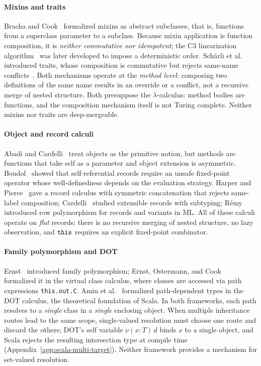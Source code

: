 \paragraph{Mixins and traits}
Bracha and Cook~\cite{bracha1990-mixin-inheritance} formalized mixins as
abstract subclasses, that is, functions from a superclass parameter to a
subclass.
Because mixin application is function composition, it is
\emph{neither commutative nor idempotent}; the C3 linearization
algorithm~\cite{barrett1996-c3-linearization} was later developed to impose a
deterministic order.
Sch\"arli et al.~\cite{scharli2003-traits} introduced traits,
whose composition is commutative but rejects same-name
conflicts~\cite{ducasse2006-traits-fine-grained-reuse}.
Both mechanisms operate at the \emph{method level}: composing two
definitions of the same name results in an override or a conflict,
not a recursive merge of nested structure.
Both presuppose the $\lambda$-calculus: method bodies are functions,
and the composition mechanism itself is not Turing complete.
Neither mixins nor traits are deep-mergeable.

\paragraph{Object and record calculi}
Abadi and Cardelli~\cite{abadi1996-theory-of-objects} treat objects as the
primitive notion, but methods are functions that take self as a
parameter and object extension is asymmetric.
Boudol~\cite{boudol2004-recursive-record-semantics} showed that self-referential
records require an unsafe fixed-point operator whose
well-definedness depends on the evaluation strategy.
Harper and Pierce~\cite{harper1991-symmetric-record-concatenation} gave a record
calculus with symmetric concatenation that rejects same-label
composition;
Cardelli~\cite{cardelli1992-extensible-records} studied extensible records
with subtyping;
R\'emy~\cite{remy1989-row-polymorphism} introduced row polymorphism for
records and variants in ML.
All of these calculi operate on \emph{flat} records: there is
no recursive merging of nested structure, no lazy observation,
and $\mathtt{this}$ requires an explicit fixed-point combinator.

\paragraph{Family polymorphism and DOT}
Ernst~\cite{ernst2001-family-polymorphism} introduced family polymorphism;
Ernst, Ostermann, and Cook~\cite{ernst2006-virtual-class-calculus}
formalized it in the virtual class calculus, where classes are
accessed via path expressions \texttt{this.out.C}.
Amin et al.~\cite{amin2016-dependent-object-types} formalized path-dependent types
in the DOT calculus, the theoretical foundation of Scala.
In both frameworks, each path resolves to a
\emph{single} class in a \emph{single} enclosing object.
When multiple inheritance routes lead to the same scope,
single-valued resolution must choose one route and discard the
others; DOT's self variable $\nu(x : T)\, d$ binds $x$ to a
single object, and Scala rejects the resulting intersection
type at compile time
(Appendix~\ref{app:scala-multi-target}).
Neither framework provides a mechanism for set-valued
resolution.

